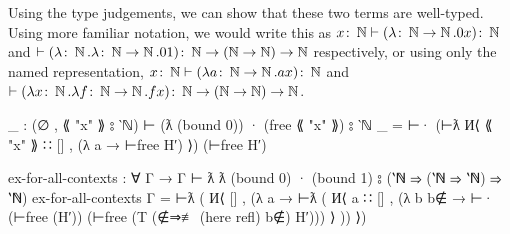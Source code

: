 Using the type judgements, we can show that these two terms are well-typed. Using more familiar
notation, we would write this as $x \colon \operatorname{\mathbb{N}} \vdash (\lambda \colon \operatorname{\mathbb{N}} \to \operatorname{\mathbb{N}}. 0x) \colon \operatorname{\mathbb{N}}$
and $\vdash (\lambda \colon \operatorname{\mathbb{N}}. \lambda \colon \operatorname{\mathbb{N}} \to \operatorname{\mathbb{N}}. 01) \colon \operatorname{\mathbb{N}} \to (\operatorname{\mathbb{N}}
\to \operatorname{\mathbb{N}}) \to \operatorname{\mathbb{N}}$ respectively, or using only the named representation, $x \colon \operatorname{\mathbb{N}} \vdash
(\lambda a \colon \operatorname{\mathbb{N}} \to \operatorname{\mathbb{N}}. ax) \colon \operatorname{\mathbb{N}}$ and $\vdash (\lambda x \colon \operatorname{\mathbb{N}}. \lambda
f \colon \operatorname{\mathbb{N}} \to \operatorname{\mathbb{N}}. fx) \colon \operatorname{\mathbb{N}} \to (\operatorname{\mathbb{N}} \to \operatorname{\mathbb{N}}) \to \operatorname{\mathbb{N}}$.
\begin{code}
  _ : (∅ , ⟪ "x" ⟫ ⦂ ‵ℕ) ⊢ (ƛ (bound 0)) · (free ⟪ "x" ⟫) ⦂ ‵ℕ
  _ = ⊢· (⊢ƛ И⟨ ⟪ "x" ⟫ ∷ [] , (λ a → ⊢free H′) ⟩) (⊢free H′)

  ex-for-all-contexts : ∀ {Γ} → Γ ⊢ ƛ ƛ (bound 0) · (bound 1) ⦂ (‵ℕ ⇒ (‵ℕ ⇒ ‵ℕ) ⇒ ‵ℕ)
  ex-for-all-contexts {Γ} = ⊢ƛ (
    И⟨ [] , (λ a → ⊢ƛ (
      И⟨ a ∷ []
      , (λ b {b∉} → ⊢· (⊢free (H′)) (⊢free (T (∉⇒≢ (here refl) b∉) H′))) ⟩ )) ⟩)
\end{code}

